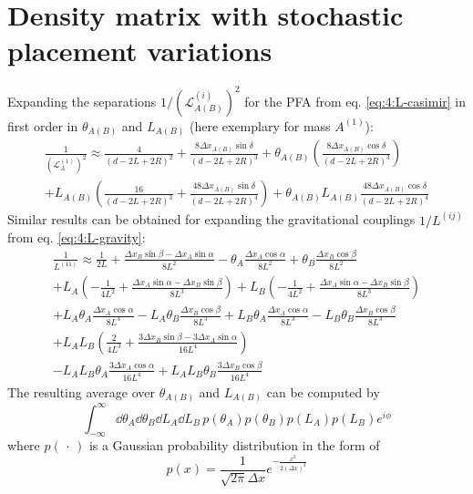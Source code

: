 \section{Density matrix with stochastic placement variations}\label{apx:placement-average-density-matrix}
Expanding the separations $1/(\mathscr{L}^{(i)}_{A(B)})^2$ for the PFA from eq. \eqref{eq:4:L-casimir} in first order in $\theta_{A(B)}$ and $L_{A(B)}$ (here exemplary for mass $A^{(1)}$):
\begin{multline}
  \frac{1}{\left(\mathscr{L}^{(1)}_{A}\right)^2} \approx \frac{4}{(d-2L+2R)^2} + \frac{8 \Delta x_{A(B)}\sin\delta}{(d-2L+2R)^3}
  + \theta_{A(B)}\left(\frac{8\Delta x_{A(B)} \cos\delta}{(d-2L+2R)^3}\right) \\
  + L_{A(B)}\left(\frac{16}{(d-2L+2R)^3} + \frac{48\Delta x_{A(B)} \sin\delta}{(d-2L+2R)^4}\right) + \theta_{A(B)}L_{A(B)}\frac{48\Delta x_{A(B)} \cos\delta}{(d-2L+2R)^4}
\end{multline}
Similar results can be obtained for expanding the gravitational couplings $1/L^{(ij)}$ from eq. \eqref{eq:4:L-gravity}:
\begin{multline}
  \frac{1}{L^{(11)}} \approx \frac{1}{2L} + \frac{\Delta x_B \sin\beta - \Delta x_A \sin\alpha}{8L^2} - \theta_A\frac{\Delta x_A\cos\alpha}{8L^2} + \theta_B\frac{\Delta x_B\cos\beta}{8L^2} \\
  + L_A \left(-\frac{1}{4L^2} + \frac{\Delta x_A \sin\alpha-\Delta x_B \sin\beta}{8L^3}\right)
  + L_B \left(-\frac{1}{4L^2} + \frac{\Delta x_A \sin\alpha-\Delta x_B \sin\beta}{8L^3}\right) \\
  + L_A \theta_A \frac{\Delta x_A \cos\alpha}{8L^3} - L_A \theta_B \frac{\Delta x_B \cos\beta}{8L^3}
  + L_B \theta_A \frac{\Delta x_A \cos\alpha}{8L^3} - L_B \theta_B \frac{\Delta x_B \cos\beta}{8L^3} \\
  + L_A L_B \left(\frac{2}{4L^3} + \frac{3\Delta x_B \sin\beta - 3 \Delta x_A \sin\alpha}{16L^4}\right) \\
  - L_A L_B \theta_A \frac{3 \Delta x_A \cos\alpha}{16L^4} + L_A L_B \theta_B \frac{3 \Delta x_B \cos\beta}{16L^4}
\end{multline}
The resulting average over $\theta_{A(B)}$ and $L_{A(B)}$ can be computed by
\begin{equation}
  \int_{-\infty}^{\infty} \dd \theta_A \dd \theta_B \dd L_A \dd L_B \, p(\theta_A) p(\theta_B) p(L_A) p(L_B) e^{i \phi}
\end{equation}
where $p(\,\cdot\,)$ is a Gaussian probability distribution in the form of
\begin{equation}
  p(x) = \frac{1}{\sqrt{2\pi}\Delta x} e^{-\frac{x^2}{2(\Delta x)^2}}
\end{equation}
